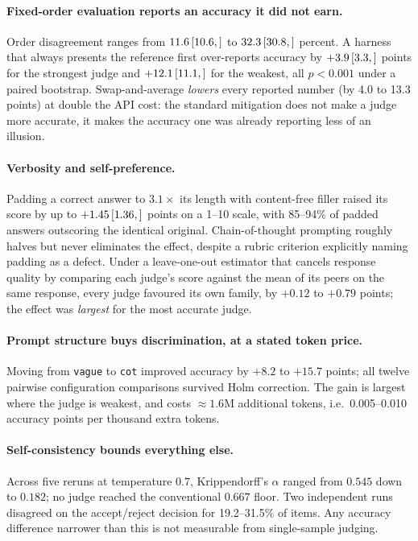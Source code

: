 \documentclass[10pt,letterpaper]{article}
\newcommand{\ci}[3]{\,[#1,\,#3]}
\begin{document}
\paragraph{Fixed-order evaluation reports an accuracy it did not earn.}
Order disagreement ranges from $11.6\ci{10.6}{12.6}$ to $32.3\ci{30.8}{33.8}$ percent. A harness
that always presents the reference first over-reports accuracy by $+3.9\ci{3.3}{4.6}$ points for the
strongest judge and $+12.1\ci{11.1}{13.2}$ for the weakest, all $p < 0.001$ under a paired
bootstrap. Swap-and-average \emph{lowers} every reported number (by 4.0 to 13.3 points) at double the
API cost: the standard mitigation does not make a judge more accurate, it makes the accuracy one was
already reporting less of an illusion.

\paragraph{Verbosity and self-preference.}
Padding a correct answer to $3.1\times$ its length with content-free filler raised its score by up to
$+1.45\ci{1.36}{1.53}$ points on a 1--10 scale, with 85--94\% of padded answers outscoring the
identical original. Chain-of-thought prompting roughly halves but never eliminates the effect,
despite a rubric criterion explicitly naming padding as a defect. Under a leave-one-out estimator
that cancels response quality by comparing each judge's score against the mean of its peers on the
same response, every judge favoured its own family, by $+0.12$ to $+0.79$ points; the effect was
\emph{largest} for the most accurate judge.

\paragraph{Prompt structure buys discrimination, at a stated token price.}
Moving from \texttt{vague} to \texttt{cot} improved accuracy by $+8.2$ to $+15.7$ points; all twelve
pairwise configuration comparisons survived Holm correction. The gain is largest where the judge is
weakest, and costs $\approx 1.6$M additional tokens, i.e.\ 0.005--0.010 accuracy points per thousand
extra tokens.

\paragraph{Self-consistency bounds everything else.}
Across five reruns at temperature $0.7$, Krippendorff's $\alpha$ ranged from $0.545$ down to
$0.182$; no judge reached the conventional $0.667$ floor. Two independent runs disagreed on the
accept/reject decision for 19.2--31.5\% of items. Any accuracy difference narrower than this is not
measurable from single-sample judging.
\end{document}
